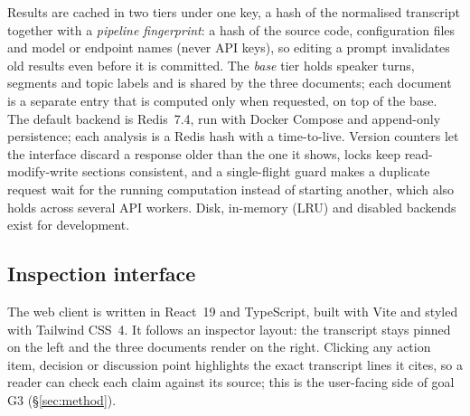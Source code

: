 Results are cached in two tiers under one key, a hash of the normalised transcript together with a \emph{pipeline fingerprint}: a hash of the source code, configuration files and model or endpoint names (never API keys), so editing a prompt invalidates old results even before it is committed.
The \emph{base} tier holds speaker turns, segments and topic labels and is shared by the three documents; each document is a separate entry that is computed only when requested, on top of the base.
The default backend is Redis~7.4, run with Docker Compose and append-only persistence; each analysis is a Redis hash with a time-to-live.
Version counters let the interface discard a response older than the one it shows, locks keep read-modify-write sections consistent, and a single-flight guard makes a duplicate request wait for the running computation instead of starting another, which also holds across several API workers.
Disk, in-memory (LRU) and disabled backends exist for development.

\subsection{Inspection interface}
\label{sec:system:ui}

The web client is written in React~19 and TypeScript, built with Vite and styled with Tailwind CSS~4.
It follows an inspector layout: the transcript stays pinned on the left and the three documents render on the right.
Clicking any action item, decision or discussion point highlights the exact transcript lines it cites, so a reader can check each claim against its source; this is the user-facing side of goal G3 (\S\ref{sec:method}).
